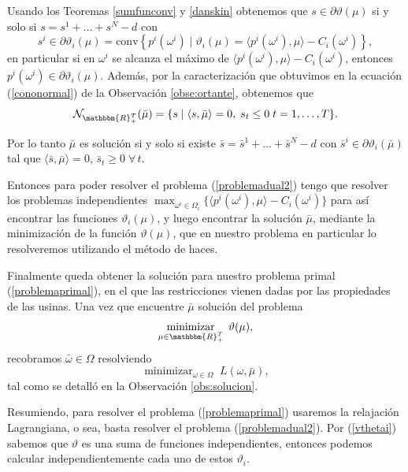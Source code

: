 \documentclass[a4paper,12pt]{report}
\newcommand{\la}{\langle}
\newcommand{\ra}{\rangle}
\newcommand{\RR}{\mathbbm{R}}
\newcommand{\vth}{\vartheta}
\newcommand{\om}{\omega}
\newcommand{\bmu}{\bar{\mu}}
\newcommand{\cN}{\mathcal{N}}
\newcounter{obs}
\begin{document}
Usando los Teoremas \ref{sumfunconv} y \ref{danskin} obtenemos que $s\in\partial\vth(\mu)$ si y solo si \linebreak $s=s^1+\ldots+s^N-d$ con 
$$s^i\in\partial\vth_i(\mu)=\mathrm{conv}\left\{p^i(\om^i)\mid \vth_i(\mu)=\la p^i(\om^i),\mu\ra-C_i(\om^i)\right\},$$
en particular si en $\om^i$ se alcanza el m\'aximo de $\la p^i(\om^i),\mu\ra-C_i(\om^i)$, entonces \linebreak $p^i(\om^i)\in\partial\vth_i(\mu)$.
Adem\'as, por la caracterizaci\'on que obtuvimos en la ecuaci\'on (\ref{cononormal}) de la Observaci\'on \ref{obse:ortante}, obtenemos que
$$\cN_{\RR^T_+}(\bmu)=\{s\mid \la s,\bmu\ra=0,\;s_t\leq 0\; t=1,\ldots,T\}.$$





Por lo tanto $\bmu$ es soluci\'on si y solo si existe $\bar{s}=\bar{s}^1+\ldots+\bar{s}^N-d$ con $\bar{s}^i\in\partial\vth_i(\bmu)$ tal que $\la \bar{s},\bmu\ra=0$, $\bar{s}_t\geq 0\;\forall\,t$.


Entonces para poder resolver el problema (\ref{problemadual2}) tengo que resolver los problemas independientes $\max_{\om^i\in\Omega_i}\{\la p^i(\om^i),\mu\ra-C_i(\om^i)\}$ para as\'i encontrar las funciones $\vartheta_i(\mu)$, y luego encontrar la soluci\'on $\bmu$, mediante la minimizaci\'on de la funci\'on $\vartheta(\mu)$, que en nuestro problema en particular lo resolveremos utilizando el m\'etodo de haces.

Finalmente queda obtener la soluci\'on para nuestro problema primal (\ref{problemaprimal}), en el que las restricciones vienen dadas por las propiedades de las usinas. Una vez que encuentre $\bmu$ soluci\'on del problema 
$$ \mathop{\mathrm{minimizar}}_{\mu\in\RR^T_+}\;\vartheta (\mu),$$
recobramos $\bar{\om}\in\Omega$ resolviendo
$$\displaystyle{\mathop{\mathrm{minimizar}}_{\om\in\Omega}}\;L(\om,\bmu),$$ 
tal como se detall\'o en la Observaci\'on \ref{obs:solucion}.

Resumiendo, para resolver el problema (\ref{problemaprimal}) usaremos la relajaci\'on Lagrangiana, o sea, basta resolver el problema (\ref{problemadual2}). Por (\ref{vthetai}) sabemos que $\vth$ es una suma de funciones independientes, entonces podemos calcular independientemente cada uno de estos $\vth_i$.
\end{document}
